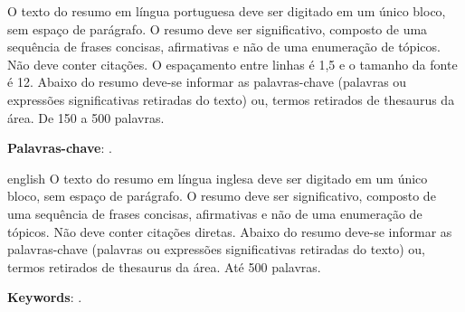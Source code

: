 \setlength{\absparsep}{18pt} %
\begin{resumo}
O texto do resumo em língua portuguesa deve ser digitado em um único bloco, sem espaço de parágrafo. O resumo deve ser significativo, composto de uma sequência de frases concisas, afirmativas e não de uma enumeração de tópicos. Não deve conter citações. O espaçamento entre linhas é 1,5 e o tamanho da fonte é 12. Abaixo do resumo deve-se informar as palavras-chave (palavras ou expressões significativas retiradas do texto) ou, termos retirados de thesaurus da área. De 150 a 500 palavras.
	
\textbf{Palavras-chave}: \PalavrasChave.
\end{resumo}

\begin{resumo}[Abstract]
\begin{otherlanguage*}{english}
O texto do resumo em língua inglesa deve ser digitado em um único bloco, sem espaço de parágrafo. O resumo deve ser significativo, composto de uma sequência de frases concisas, afirmativas e não de uma enumeração de tópicos. Não deve conter citações diretas. Abaixo do resumo deve-se informar as palavras-chave (palavras ou expressões significativas retiradas do texto) ou, termos retirados de thesaurus da área. Até 500 palavras.
 
\textbf{Keywords}: \Keywords.
\end{otherlanguage*}
\end{resumo}